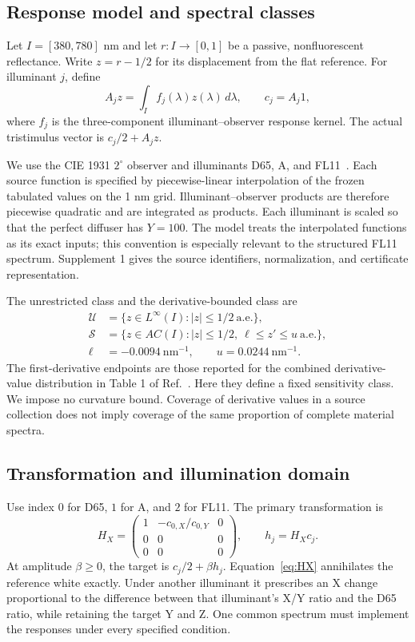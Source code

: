 \documentclass{optica-article}
\begin{document}
\subsection{Response model and spectral classes}
Let $I=[380,780]$ nm and let $r:I\to[0,1]$ be a passive, nonfluorescent reflectance. Write $z=r-1/2$ for its displacement from the flat reference. For illuminant $j$, define
\begin{equation}
 A_j z=\int_I f_j(\lambda)z(\lambda)\,d\lambda,
 \qquad c_j=A_j1,
 \label{eq:response}
\end{equation}
where $f_j$ is the three-component illuminant--observer response kernel. The actual tristimulus vector is $c_j/2+A_jz$.

We use the CIE 1931 $2^\circ$ observer and illuminants D65, A, and FL11~\cite{CIEObserver,CIED65,CIEA,CIEFL}. Each source function is specified by piecewise-linear interpolation of the frozen tabulated values on the 1 nm grid. Illuminant--observer products are therefore piecewise quadratic and are integrated as products. Each illuminant is scaled so that the perfect diffuser has $Y=100$. The model treats the interpolated functions as its exact inputs; this convention is especially relevant to the structured FL11 spectrum. Supplement 1 gives the source identifiers, normalization, and certificate representation.

The unrestricted class and the derivative-bounded class are
\begin{align}
 \mathcal U&=\{z\in L^\infty(I): |z|\leq1/2\ \text{a.e.}\},\label{eq:U}\\
 \mathcal S&=\{z\in AC(I): |z|\leq1/2,\ \ell\leq z'\leq u\ \text{a.e.}\},\label{eq:S}\\
 \ell&=-0.0094\ \mathrm{nm}^{-1},\qquad u=0.0244\ \mathrm{nm}^{-1}.\nonumber
\end{align}
The first-derivative endpoints are those reported for the combined derivative-value distribution in Table 1 of Ref.~\cite{Flinkman2012}. Here they define a fixed sensitivity class. We impose no curvature bound. Coverage of derivative values in a source collection does not imply coverage of the same proportion of complete material spectra.

\subsection{Transformation and illumination domain}
Use index $0$ for D65, $1$ for A, and $2$ for FL11. The primary transformation is
\begin{equation}
 H_X=\begin{pmatrix}1&-c_{0,X}/c_{0,Y}&0\\0&0&0\\0&0&0\end{pmatrix},
 \qquad h_j=H_Xc_j.
 \label{eq:HX}
\end{equation}
At amplitude $\beta\geq0$, the target is $c_j/2+\beta h_j$. Equation~\eqref{eq:HX} annihilates the reference white exactly. Under another illuminant it prescribes an X change proportional to the difference between that illuminant's X/Y ratio and the D65 ratio, while retaining the target Y and Z. One common spectrum must implement the responses under every specified condition.
\end{document}
